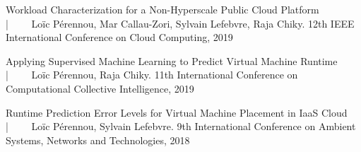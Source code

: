 
\begin{cventries}

  \cventry
    {} %
    {} %
    {} %
    {} %
    {
      \vspace{-.5cm}
      \begin{cvitems} %
      \item {Workload Characterization for a Non-Hyperscale Public Cloud Platform \\ 
	|~~~~ Loïc Pérennou, Mar Callau-Zori, Sylvain Lefebvre, Raja Chiky. 12th IEEE International Conference on Cloud Computing, 2019}
        \item {Applying Supervised Machine Learning to Predict Virtual Machine Runtime \\
	  |~~~~ Loïc Pérennou, Raja Chiky. 11th International Conference on Computational Collective Intelligence, 2019} 
        \item {Runtime Prediction Error Levels for Virtual Machine Placement in IaaS Cloud \\
	  |~~~~ Loïc Pérennou, Sylvain Lefebvre. 9th International Conference on Ambient Systems, Networks and Technologies, 2018 }
      \end{cvitems}
    }

\end{cventries}

